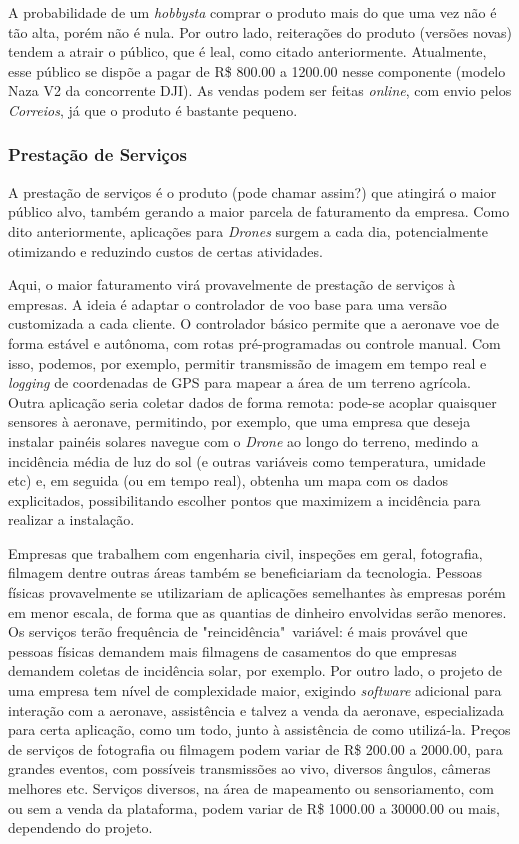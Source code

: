 A probabilidade de um \emph{hobbysta} comprar o produto mais do que uma vez não é tão alta, porém não é nula. Por outro lado, reiterações do produto (versões novas) tendem a atrair o público, que é leal, como citado anteriormente. Atualmente, esse público se dispõe a pagar de R\$ 800.00 a 1200.00 nesse componente (modelo Naza V2 da concorrente DJI). As vendas podem ser feitas \emph{online}, com envio pelos \emph{Correios}, já que o produto é bastante pequeno.

\subsubsection*{Prestação de Serviços}

A prestação de serviços é o produto (pode chamar assim?) que atingirá o maior público alvo, também gerando a maior parcela de faturamento da empresa. Como dito anteriormente, aplicações para \emph{Drones} surgem a cada dia, potencialmente otimizando e reduzindo custos de certas atividades.

Aqui, o maior faturamento virá provavelmente de prestação de serviços à empresas. A ideia é adaptar o controlador de voo base para uma versão customizada a cada cliente. O controlador básico permite que a aeronave voe de forma estável e autônoma, com rotas pré-programadas ou controle manual. Com isso, podemos, por exemplo, permitir transmissão de imagem em tempo real e \emph{logging} de coordenadas de GPS para mapear a área de um terreno agrícola. Outra aplicação seria coletar dados de forma remota: pode-se acoplar quaisquer sensores à aeronave, permitindo, por exemplo, que uma empresa que deseja instalar painéis solares navegue com o \emph{Drone} ao longo do terreno, medindo a incidência média de luz do sol (e outras variáveis como temperatura, umidade etc) e, em seguida (ou em tempo real), obtenha um mapa com os dados explicitados, possibilitando escolher pontos que maximizem a incidência para realizar a instalação.

Empresas que trabalhem com engenharia civil, inspeções em geral, fotografia, filmagem dentre outras áreas também se beneficiariam da tecnologia. Pessoas físicas provavelmente se utilizariam de aplicações semelhantes às empresas porém em menor escala, de forma que as quantias de dinheiro envolvidas serão menores. Os serviços terão frequência de "reincidência"\ variável: é mais provável que pessoas físicas demandem mais filmagens de casamentos do que empresas demandem coletas de incidência solar, por exemplo. Por outro lado, o projeto de uma empresa tem nível de complexidade maior, exigindo \emph{software} adicional para interação com a aeronave, assistência e talvez a venda da aeronave, especializada para certa aplicação, como um todo, junto à assistência de como utilizá-la. Preços de serviços de fotografia ou filmagem podem variar de R\$ 200.00 a 2000.00, para grandes eventos, com possíveis transmissões ao vivo, diversos ângulos, câmeras melhores etc. Serviços diversos, na área de mapeamento ou sensoriamento, com ou sem a venda da plataforma, podem variar de R\$ 1000.00 a 30000.00 ou mais, dependendo do projeto.

